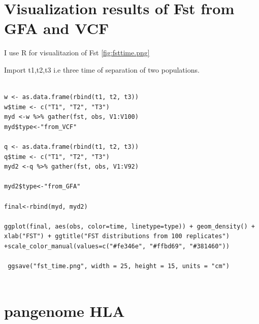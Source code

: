 \section{Visualization results of Fst from GFA and VCF}

I use R for visualitazion of Fst \ref{fig:fsttime.png}

Import t1,t2,t3 i.e three time of separation of two populations.

\begin{verbatim}

w <- as.data.frame(rbind(t1, t2, t3))
w$time <- c("T1", "T2", "T3")
myd <-w %>% gather(fst, obs, V1:V100)
myd$type<-"from_VCF"

q <- as.data.frame(rbind(t1, t2, t3))
q$time <- c("T1", "T2", "T3")
myd2 <-q %>% gather(fst, obs, V1:V92)

myd2$type<-"from_GFA"

final<-rbind(myd, myd2)

ggplot(final, aes(obs, color=time, linetype=type)) + geom_density() + xlab("FST") + ggtitle("FST distributions from 100 replicates") +scale_color_manual(values=c("#fe346e", "#ffbd69", "#381460"))

 ggsave("fst_time.png", width = 25, height = 15, units = "cm")
 
\end{verbatim}

\section{pangenome HLA}

